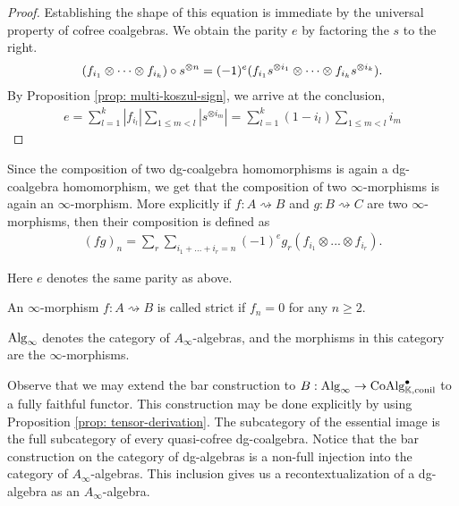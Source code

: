 \documentclass[../thesis.tex]{subfiles}
\begin{document}
        \begin{proof}
            Establishing the shape of this equation is immediate by the universal property of cofree coalgebras. We obtain the parity $e$ by factoring the $s$ to the right.
            \begin{align*}
                (f_{i_1} \otimes \cdots \otimes f_{i_k}) \circ s^{\otimes n} = (-1)^e(f_{i_1}s^{\otimes i_1} \otimes \cdots \otimes f_{i_k}s^{\otimes i_k})\tt{.}
            \end{align*}
            By Proposition \ref{prop: multi-koszul-sign}, we arrive at the conclusion,
            \begin{align*}
                e = \sum_{l = 1}^k|f_{i_l}|\sum_{1\leq m < l}|s^{\otimes i_m}|= \sum_{l = 1}^k(1- i_l)\sum_{1 \leq m < l}i_m
            \end{align*}
        \end{proof}

        Since the composition of two dg-coalgebra homomorphisms is again a dg-coalgebra homomorphism, we get that the composition of two $\infty$-morphisms is again an $\infty$-morphism. More explicitly if $f:A\rightsquigarrow B$ and $g: B\rightsquigarrow C$ are two $\infty$-morphisms, then their composition is defined as
        \begin{align*}
            (fg)_n = \sum_r\sum_{i_1 + ... + i_r = n} (-1)^eg_r(f_{i_1}\otimes ... \otimes f_{i_r})\text{.}
        \end{align*}

        Here $e$ denotes the same parity as above.

        \begin{definition}
            An $\infty$-morphism $f: A\rightsquigarrow B$ is called strict if $f_n = 0$ for any $n\geq 2$. 
        \end{definition}

        \begin{definition}
            $\tt{Alg}_\infty$ denotes the category of $A_\infty$-algebras, and the morphisms in this category are the $\infty$-morphisms.
        \end{definition}

        Observe that we may extend the bar construction to $B: \tt{Alg}_\infty \rightarrow \tt{Co\tt{Alg}}_{\mathbb{K},\tt{conil}}^\bullet$ to a fully faithful functor. This construction may be done explicitly by using Proposition \ref{prop: tensor-derivation}. The subcategory of the essential image is the full subcategory of every quasi-cofree dg-coalgebra. Notice that the bar construction on the category of dg-algebras is a non-full injection into the category of $A_\infty$-algebras. This inclusion gives us a recontextualization of a dg-algebra as an $A_\infty$-algebra.
\end{document}
